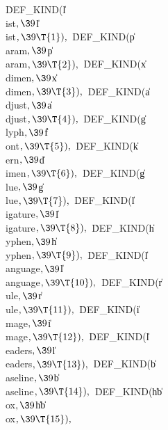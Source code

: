 \.{DEF\_KIND}(\|l\J\\{ist}${},\39{}$\|l\J\\{ist}${},\39\T{1}),{}$\6
\.{DEF\_KIND}(\|p\J\\{aram}${},\39{}$\|p\J\\{aram}${},\39\T{2}),{}$\6
\.{DEF\_KIND}(\|x\J\\{dimen}${},\39{}$\|x\J\\{dimen}${},\39\T{3}),{}$\6
\.{DEF\_KIND}(\|a\J\\{djust}${},\39{}$\|a\J\\{djust}${},\39\T{4}),{}$\6
\.{DEF\_KIND}(\|g\J\\{lyph}${},\39{}$\|f\J\\{ont}${},\39\T{5}),{}$\6
\.{DEF\_KIND}(\|k\J\\{ern}${},\39{}$\|d\J\\{imen}${},\39\T{6}),{}$\6
\.{DEF\_KIND}(\|g\J\\{lue}${},\39{}$\|g\J\\{lue}${},\39\T{7}),{}$\6
\.{DEF\_KIND}(\|l\J\\{igature}${},\39{}$\|l\J\\{igature}${},\39\T{8}),{}$\6
\.{DEF\_KIND}(\|h\J\\{yphen}${},\39{}$\|h\J\\{yphen}${},\39\T{9}),{}$\6
\.{DEF\_KIND}(\|l\J\\{anguage}${},\39{}$\|l\J\\{anguage}${},\39\T{10}),{}$\6
\.{DEF\_KIND}(\|r\J\\{ule}${},\39{}$\|r\J\\{ule}${},\39\T{11}),{}$\6
\.{DEF\_KIND}(\|i\J\\{mage}${},\39{}$\|i\J\\{mage}${},\39\T{12}),{}$\6
\.{DEF\_KIND}(\|l\J\\{eaders}${},\39{}$\|l\J\\{eaders}${},\39\T{13}),{}$\6
\.{DEF\_KIND}(\|b\J\\{aseline}${},\39{}$\|b\J\\{aseline}${},\39\T{14}),{}$\6
\.{DEF\_KIND}(\|h\J\|b\J\\{ox}${},\39{}$\|h\J\|b\J\\{ox}${},\39\T{15}),{}$\6
